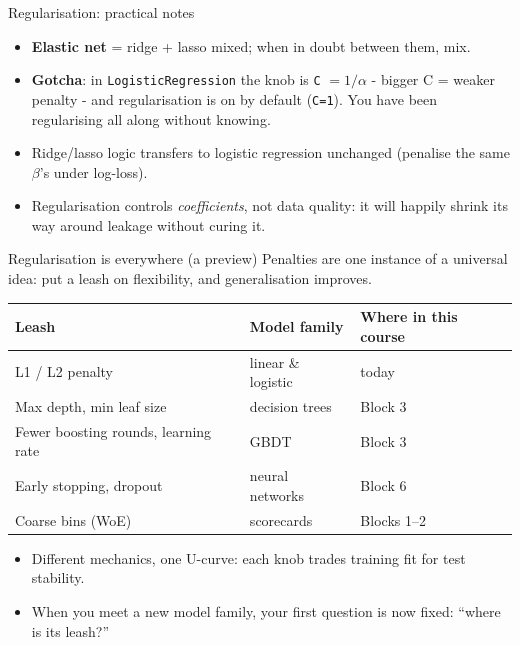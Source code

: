 \documentclass[10pt,aspectratio=169]{beamer}
\begin{document}
\begin{frame}{Regularisation: practical notes}
  \begin{itemize}
    \item \textbf{Elastic net} = ridge + lasso mixed; when in doubt between
          them, mix.
    \item \textbf{Gotcha}: in \texttt{LogisticRegression} the knob is
          \texttt{C} $= 1/\alpha$ - \alert{bigger C = weaker penalty} -
          and regularisation is \alert{on by default} (\texttt{C=1}).
          You have been regularising all along without knowing.
    \item Ridge/lasso logic transfers to logistic regression unchanged
          (penalise the same $\beta$'s under log-loss).
    \item Regularisation controls \emph{coefficients}, not data quality:
          it will happily shrink its way around leakage without curing it.
  \end{itemize}
\end{frame}

\begin{frame}{Regularisation is everywhere (a preview)}
  Penalties are one instance of a universal idea: \alert{put a leash on
  flexibility, and generalisation improves}.
  \vspace{0.3em}
  \small
  \begin{center}
  \begin{tabular}{@{}lll@{}}
    \toprule
    Leash & Model family & Where in this course \\
    \midrule
    L1 / L2 penalty & linear \& logistic & today \\
    Max depth, min leaf size & decision trees & Block 3 \\
    Fewer boosting rounds, learning rate & GBDT & Block 3 \\
    Early stopping, dropout & neural networks & Block 6 \\
    Coarse bins (WoE) & scorecards & Blocks 1--2 \\
    \bottomrule
  \end{tabular}
  \end{center}
  \vspace{0.5em}
  \begin{itemize}\small
    \item Different mechanics, one U-curve: each knob trades training fit
          for test stability.
    \item When you meet a new model family, your first question is now
          fixed: \alert{``where is its leash?''}
  \end{itemize}
\end{frame}
\end{document}
